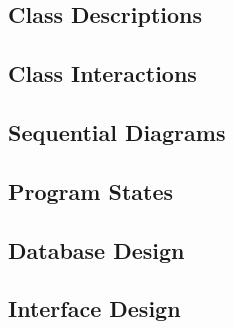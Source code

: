 \documentclass[12pt]{article}
\begin{document}
\subsection{Class Descriptions}


\subsection{Class Interactions}


\subsection{Sequential Diagrams}


\subsection{Program States}


\pagebreak 

\subsection{Database Design}


\subsection{Interface Design}

\end{document}
